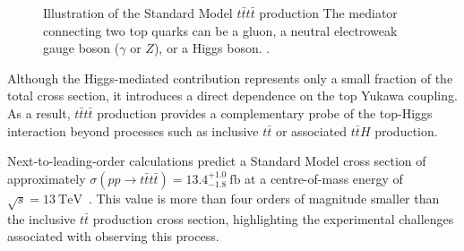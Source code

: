 \begin{figure}[htbp]
\begin{subfigure}[b]{0.45\textwidth}
\end{subfigure}
\caption{Illustration of the Standard Model $t\bar{t}t\bar{t}$ production The mediator connecting two top quarks can be a gluon, a neutral electroweak gauge boson ($\gamma$ or $Z$), or a Higgs boson.
.}
\label{fig:four-tops-schematic}
\end{figure}

Although the Higgs-mediated contribution represents only a small fraction of the total cross section, it introduces a direct dependence on the top Yukawa coupling.
As a result, $t\bar{t}t\bar{t}$ production provides a complementary probe of the top-Higgs interaction beyond processes such as inclusive $t\bar{t}$ or associated $t\bar{t}H$ production.

Next-to-leading-order calculations predict a Standard Model cross section of approximately $\sigma(pp \to t\bar{t}t\bar{t}) = 13.4^{+1.0}_{-1.8}~\mathrm{fb}$ at a centre-of-mass energy of $\sqrt{s}=13~\mathrm{TeV}$~\cite{vanBeekveld:2022hty}.
This value is more than four orders of magnitude smaller than the inclusive $t\bar{t}$ production cross section, highlighting the experimental challenges associated with observing this process.

